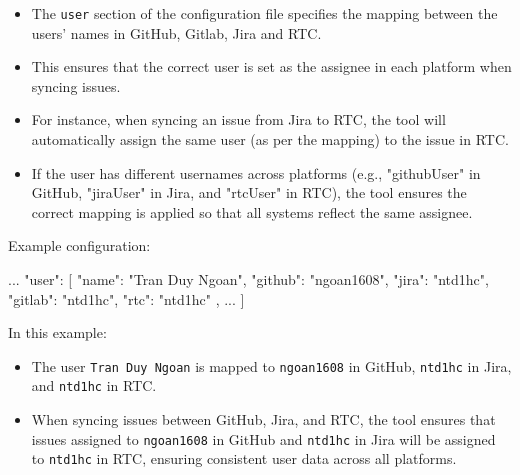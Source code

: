 \begin{itemize}
   \item The \texttt{user} section of the configuration file specifies the 
         mapping between the users' names in GitHub, Gitlab, Jira and RTC. 
   \item This ensures that the correct user is set as the assignee in each 
         platform when syncing issues.
   \item For instance, when syncing an issue from Jira to RTC, the tool will 
         automatically assign the same user (as per the mapping) to the issue in RTC. 
   \item If the user has different usernames across platforms 
         (e.g., "githubUser" in GitHub, "jiraUser" in Jira, and "rtcUser" in RTC), 
         the tool ensures the correct mapping is applied so that all systems 
         reflect the same assignee.
\end{itemize}

Example configuration:
\begin{pythoncode}
{
   ... 
   "user": [
      {
         "name": "Tran Duy Ngoan",
         "github": "ngoan1608",
         "jira": "ntd1hc",
         "gitlab": "ntd1hc",
         "rtc": "ntd1hc"
      },
      ... 
   ]   
}
\end{pythoncode}

In this example:
\begin{itemize}
    \item The user \texttt{Tran Duy Ngoan} is mapped to \texttt{ngoan1608} in 
          GitHub, \texttt{ntd1hc} in Jira, and \texttt{ntd1hc} in RTC.
    \item When syncing issues between GitHub, Jira, and RTC, the tool ensures 
          that issues assigned to \texttt{ngoan1608} in GitHub and 
          \texttt{ntd1hc} in Jira will be assigned to \texttt{ntd1hc} in RTC, 
          ensuring consistent user data across all platforms.
\end{itemize}